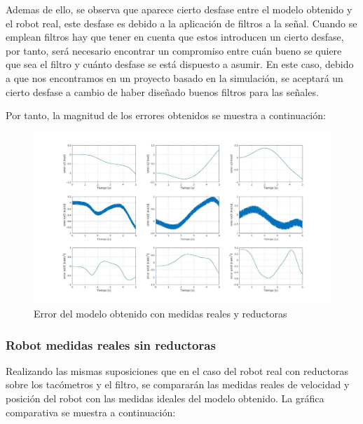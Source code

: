 Ademas de ello, se observa que aparece cierto desfase entre el modelo obtenido y el robot real, este desfase es debido a la aplicación de filtros a la señal. Cuando se emplean filtros hay que tener en cuenta que estos introducen un cierto desfase, por tanto, será necesario encontrar un compromiso entre cuán bueno se quiere que sea el filtro y cuánto desfase se está dispuesto a asumir. En este caso, debido a que nos encontramos en un proyecto basado en la simulación, se aceptará un cierto desfase a cambio de haber diseñado buenos filtros para las señales.



\newpage

Por tanto, la magnitud de los errores obtenidos se muestra a continuación:



\begin{figure}[h!]
	
	\centering
	
	\includegraphics[width=1\textwidth]{EstimacParam_SisModError_In1_RealCR}
	
	\caption{Error del modelo obtenido con medidas reales y reductoras}
	
\end{figure}



\subsubsection{Robot medidas reales sin reductoras}

Realizando las mismas suposiciones que en el caso del robot real con reductoras sobre los tacómetros y el filtro, se compararán las medidas reales de velocidad y posición del robot con las medidas ideales del modelo obtenido. La gráfica comparativa se muestra a continuación:



